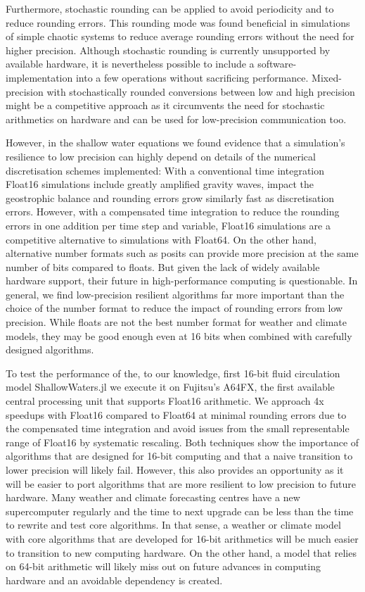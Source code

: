 Furthermore, stochastic rounding can be applied to avoid periodicity and to reduce rounding errors. This rounding mode was found beneficial in 
simulations of simple chaotic systems to reduce average rounding errors without the need for higher precision.  Although stochastic rounding is
currently unsupported by available hardware, it is nevertheless possible to include a software-implementation into a few operations without
sacrificing performance. Mixed-precision with stochastically rounded conversions between low and high precision might be a competitive
approach as it circumvents the need for stochastic arithmetics on hardware and can be used for low-precision communication too.

However, in the shallow water equations we found evidence that a simulation's resilience to low precision can highly depend on details of the
numerical discretisation schemes implemented: With a conventional time integration Float16 simulations include greatly amplified gravity waves,
impact the geostrophic balance and rounding errors grow similarly fast as discretisation errors. However, with a compensated time integration to
reduce the rounding errors in one addition per time step and variable, Float16 simulations are a competitive alternative to simulations with Float64.
On the other hand, alternative number formats such as posits can provide more precision at the same number of bits compared to floats.
But given the lack of widely available hardware support, their future in high-performance computing is questionable. In general, we find
low-precision resilient algorithms far more important than the choice of the number format to reduce the impact of rounding errors from
low precision. While floats are not the best number format for weather and climate models, they may be good enough even at 16 bits when
combined with carefully designed algorithms.

To test the performance of the, to our knowledge, first 16-bit fluid circulation model ShallowWaters.jl we execute it on Fujitsu's A64FX, the first
available central processing unit that supports Float16 arithmetic. We approach 4x speedups with Float16 compared to Float64 at minimal
rounding errors due to the compensated time integration and avoid issues from the small representable range of Float16 by systematic rescaling.
Both techniques show the importance of algorithms that are designed for 16-bit computing and that a naive transition to lower precision will
likely fail. However, this also provides an opportunity as it will be easier to port algorithms that are more resilient to low precision to future hardware.
Many weather and climate forecasting centres have a new supercomputer regularly and the time to next upgrade can be less than
the time to rewrite and test core algorithms. In that sense, a weather or climate model with core algorithms that are developed for 16-bit
arithmetics will be much easier to transition to new computing hardware. On the other hand, a model that relies on 64-bit arithmetic will
likely miss out on future advances in computing hardware and an avoidable dependency is created.

